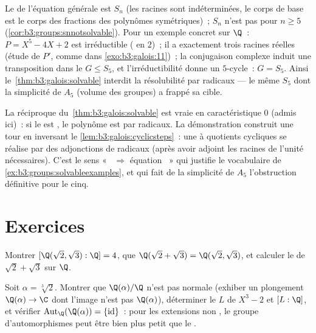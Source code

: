 Le  de l'équation générale est $S_n$ (les
racines sont indéterminées, le corps de base est le corps des
fractions des polynômes symétriques)~; $S_n$ n'est pas
 pour $n \geq 5$
(\cref{cor:b3:groups:snnotsolvable}). Pour un exemple concret
sur $\Q$~: $P = X^5 - 4X + 2$ est irréductible ( en
$2$)~; il a exactement trois racines réelles (étude de $P'$,
comme dans \cref{exo:b3:galois:11})~; la conjugaison complexe
induit une transposition dans le  $G \leq
S_5$, et l'irréductibilité donne un $5$-cycle~: $G = S_5$.
Ainsi le~\cref{thm:b3:galois:solvable} interdit la
résolubilité par radicaux --- le même $S_5$ dont la
simplicité de $A_5$ (volume des groupes) a frappé sa cible.

\begin{remark}\label{rem:b3:galois:converse}
La réciproque du~\cref{thm:b3:galois:solvable} est vraie en
caractéristique $0$ (admis ici)~: si le  est
, le polynôme est  par radicaux. La
démonstration construit une tour en inversant le
\cref{lem:b3:galois:cyclicsteps}~: une  à
quotients cycliques se réalise par des adjonctions de
radicaux (après avoir adjoint les racines de l'unité
nécessaires). C'est le sens «~ $\Rightarrow$
équation ~» qui justifie le vocabulaire de
\cref{ex:b3:groups:solvableexamples}, et qui fait de la
simplicité de $A_5$ l'obstruction définitive pour le 
cinq.
\end{remark}

\section{Exercices}

\begin{exercise}[$\star$]\label{exo:b3:galois:1}
Montrer $[\Q(\sqrt2, \sqrt3):\Q] = 4$, que $\Q(\sqrt2 + \sqrt3)
= \Q(\sqrt2, \sqrt3)$, et calculer le  de
$\sqrt2 + \sqrt3$ sur $\Q$.
\end{exercise}

\begin{exercise}[$\star$]\label{exo:b3:galois:2}
Soit $\alpha = \sqrt[3]2$. Montrer que $\Q(\alpha)/\Q$ n'est
pas normale (exhiber un plongement $\Q(\alpha) \to \C$ dont
l'image n'est pas $\Q(\alpha)$), déterminer le  $L$ de $X^3 - 2$ et $[L:\Q]$, et vérifier
$\operatorname{Aut}_\Q(\Q(\alpha)) = \{\mathrm{id}\}$~: pour
les extensions non , le groupe d'automorphismes
peut être bien plus petit que le .
\end{exercise}

